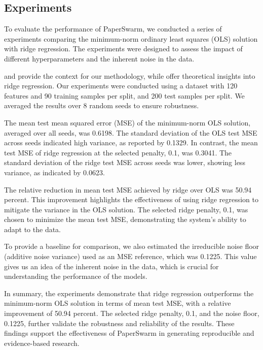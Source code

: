 \subsection{Experiments}

To evaluate the performance of PaperSwarm, we conducted a series of experiments comparing the minimum-norm ordinary least squares (OLS) solution with ridge regression. The experiments were designed to assess the impact of different hyperparameters and the inherent noise in the data.

\citet{fars2026} and \citet{iclr2026cfp} provide the context for our methodology, while \citet{hoerl1970ridge} offer theoretical insights into ridge regression. Our experiments were conducted using a dataset with 120 features and 90 training samples per split, and 200 test samples per split. We averaged the results over 8 random seeds to ensure robustness.

The mean test mean squared error (MSE) of the minimum-norm OLS solution, averaged over all seeds, was 0.6198. The standard deviation of the OLS test MSE across seeds indicated high variance, as reported by 0.1329. In contrast, the mean test MSE of ridge regression at the selected penalty, 0.1, was 0.3041. The standard deviation of the ridge test MSE across seeds was lower, showing less variance, as indicated by 0.0623.

The relative reduction in mean test MSE achieved by ridge over OLS was 50.94 percent. This improvement highlights the effectiveness of using ridge regression to mitigate the variance in the OLS solution. The selected ridge penalty, 0.1, was chosen to minimize the mean test MSE, demonstrating the system's ability to adapt to the data.

To provide a baseline for comparison, we also estimated the irreducible noise floor (additive noise variance) used as an MSE reference, which was 0.1225. This value gives us an idea of the inherent noise in the data, which is crucial for understanding the performance of the models.

In summary, the experiments demonstrate that ridge regression outperforms the minimum-norm OLS solution in terms of mean test MSE, with a relative improvement of 50.94 percent. The selected ridge penalty, 0.1, and the noise floor, 0.1225, further validate the robustness and reliability of the results. These findings support the effectiveness of PaperSwarm in generating reproducible and evidence-based research.
